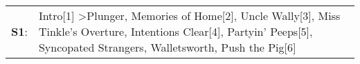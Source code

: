 \begin{supertabular}{p{0.03\textwidth}p{0.92\textwidth}}
 \textbf{S1}:  &  Intro[1]\textsuperscript{} \textgreater \enspace Plunger\textsuperscript{}, \enspace Memories of Home[2]\textsuperscript{}, \enspace Uncle Wally[3]\textsuperscript{}, \enspace Miss Tinkle's Overture\textsuperscript{}, \enspace Intentions Clear[4]\textsuperscript{}, \enspace Partyin' Peeps[5]\textsuperscript{}, \enspace Syncopated Strangers\textsuperscript{}, \enspace Walletsworth\textsuperscript{}, \enspace Push the Pig[6]\textsuperscript{}  \enspace  \\
\end{supertabular}

